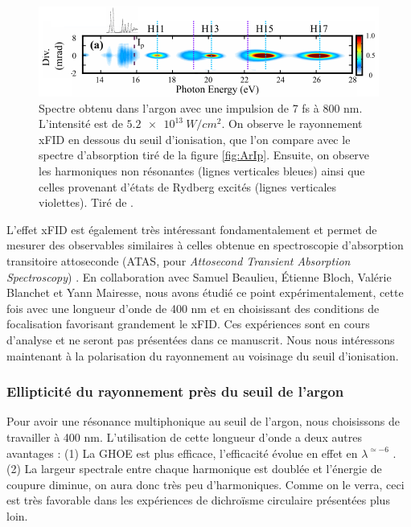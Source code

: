 \begin{figure}[!ht]
\centering
\includegraphics[width=1.1\columnwidth]{Figures/ResonantArgon/xFID.pdf}%
\caption{Spectre obtenu dans l'argon avec une impulsion de 7 fs à 800 nm. L'intensité est de $\SI{5.2e13}{W/cm^2}$. On observe le rayonnement xFID en dessous du seuil d'ionisation, que l'on compare avec le spectre d'absorption tiré de la figure \ref{fig:ArIp}. Ensuite, on observe les harmoniques non résonantes (lignes verticales bleues) ainsi que celles provenant d'états de Rydberg excités (lignes verticales violettes). Tiré de .}
\label{fig:xFID}
\end{figure}

L'effet xFID est également très intéressant fondamentalement et permet de mesurer des observables similaires à celles obtenue en spectroscopie d'absorption transitoire attoseconde (ATAS, pour \textit{Attosecond Transient Absorption Spectroscopy}) . En collaboration avec Samuel Beaulieu, \'{E}tienne Bloch, Valérie Blanchet et Yann Mairesse, nous avons étudié ce point expérimentalement, cette fois avec une longueur d'onde de 400 nm et en choisissant des conditions de focalisation favorisant grandement le xFID. Ces expériences sont en cours d'analyse et ne seront pas présentées dans ce manuscrit. Nous nous intéressons maintenant à la polarisation du rayonnement au voisinage du seuil d'ionisation.

\subsubsection{Ellipticité du rayonnement près du seuil de l'argon}
\label{sec:resonant_argon_exp}
Pour avoir une résonance multiphonique au seuil de l'argon, nous choisissons de travailler à 400 nm. L'utilisation de cette longueur d'onde a deux autres avantages : (1) La GHOE est plus efficace, l'efficacité évolue en effet en $\lambda^{\simeq-6}$ . (2) La largeur spectrale entre chaque harmonique est doublée et l'énergie de coupure diminue, on aura donc très peu d'harmoniques. Comme on le verra, ceci est très favorable dans les expériences de dichroïsme circulaire présentées plus loin. 


